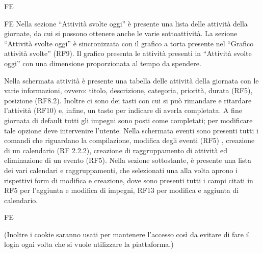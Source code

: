 \begin{listaPersonale}{FE}
\begin{listaPersonale2}{FE}
         Nella sezione “Attività svolte oggi” è presente una lista delle attività della giornate, da cui si possono ottenere anche le varie sottoattività. 
        La sezione “Attività svolte oggi” è sincronizzata con il grafico a torta presente nel “Grafico attività svolte” (RF9). Il grafico presenta le attività presenti in “Attività svolte oggi” con una dimensione proporzionata al tempo da spendere.         
    \end{listaPersonale2}
     Nella schermata attività è presente una tabella delle attività della giornata con le varie informazioni, ovvero: titolo, descrizione, categoria, priorità, durata (RF5), posizione (RF8.2). Inoltre ci sono dei tasti con cui si può rimandare e ritardare l’attività (RF10) e, infine, un tasto per indicare di averla completata. A fine giornata di default tutti gli impegni sono posti come completati; per modificare tale opzione deve intervenire l’utente.
     Nella schermata eventi sono presenti tutti i comandi che riguardano la compilazione, modifica degli eventi (RF5) , creazione di un calendario (RF 2.2.2), creazione di raggruppamento di attività ed eliminazione di un evento (RF5).
    Nella sezione sottostante, è presente una lista dei vari calendari e raggruppamenti, che selezionati una alla volta aprono i rispettivi form di modifica e creazione, dove sono presenti tutti i campi citati in RF5 per l’aggiunta e modifica di impegni, RF13 per modifica e aggiunta di calendario. 
    \begin{listaPersonale2}{FE}
    \end{listaPersonale2}
    

    


\end{listaPersonale}


(Inoltre i cookie saranno usati per mantenere l'accesso così da evitare di fare il login ogni volta che si vuole utilizzare la piattaforma.)